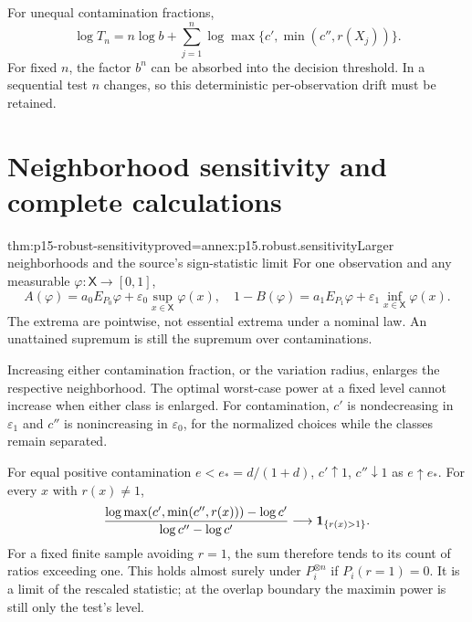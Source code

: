 For unequal contamination fractions,
\[
 \log T_n=n\log b+\sum_{j=1}^n
     \log\max\{c',\min(c'',r(X_j))\}.
\]
For fixed \(n\), the factor \(b^n\) can be absorbed into the decision
threshold. In a sequential test \(n\) changes, so this deterministic
per-observation drift must be retained.

\section{Neighborhood sensitivity and complete calculations}
\label{sec:p15-robust-examples}

\begin{hbtheorem}{thm:p15-robust-sensitivity}{proved=annex:p15.robust.sensitivity}{Larger neighborhoods and the source's sign-statistic limit}
For one observation and any measurable \(\varphi:\mathsf X\to[0,1]\),
\[
 A(\varphi)=a_0E_{P_0}\varphi+\varepsilon_0\sup_{x\in\mathsf X}\varphi(x),
 \quad
 1-B(\varphi)=a_1E_{P_1}\varphi+\varepsilon_1\inf_{x\in\mathsf X}\varphi(x).
\]
The extrema are pointwise, not essential extrema under a nominal law.
An unattained supremum is still the supremum over contaminations.

Increasing either contamination fraction, or the variation radius,
enlarges the respective neighborhood. The optimal worst-case power
at a fixed level cannot increase when either class is enlarged.
For contamination, \(c'\) is nondecreasing in \(\varepsilon_1\) and
\(c''\) is nonincreasing in \(\varepsilon_0\), for the normalized
choices while the classes remain separated.

For equal positive contamination \(e<e_*=d/(1+d)\),
\(c'\uparrow1\), \(c''\downarrow1\) as \(e\uparrow e_*\).
For every \(x\) with \(r(x)\ne1\),
\[
 \frac{\log\max(c',\min(c'',r(x)))-\log c'}
      {\log c''-\log c'}\longrightarrow {\bf1}_{\{r(x)>1\}}.
\]
For a fixed finite sample avoiding \(r=1\), the sum therefore tends
to its count of ratios exceeding one. This holds almost surely under
\(P_i^{\otimes n}\) if \(P_i(r=1)=0\).
It is a limit of the rescaled statistic; at the overlap boundary the
maximin power is still only the test's level.
\end{hbtheorem}

